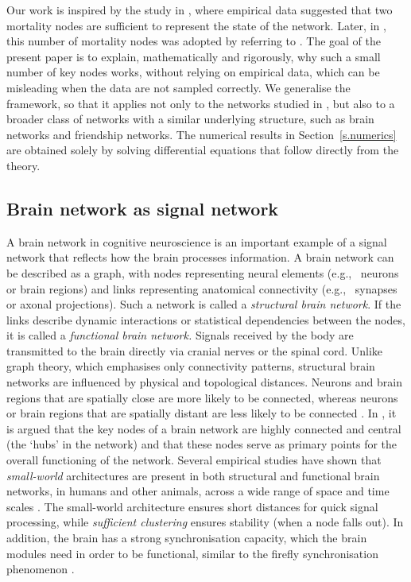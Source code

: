 \documentclass[11pt]{article}
\numberwithin{equation}{section}
\begin{document}
Our work is inspired by the study in \cite{MRFR2017}, where empirical data suggested that two mortality nodes are sufficient to represent the state of the network. Later, in \cite{Aging}, this number of mortality nodes was adopted by referring to \cite{MRFR2017}. The goal of the present paper is to explain, mathematically and rigorously, why such a small number of key nodes works, without relying on empirical data, which can be misleading when the data are not sampled correctly. We generalise the framework, so that it applies not only to the networks studied in \cite{MRFR2017, Aging}, but also to a broader class of networks with a similar underlying structure, such as brain networks and friendship networks. The numerical results in Section~\ref{s.numerics} are obtained solely by solving differential equations that follow directly from the theory.


\subsection{Brain network as signal network}
\label{ss.BN}

A brain network in cognitive neuroscience is an important example of a signal network that reflects how the brain processes information. A brain network can be described as a graph, with nodes representing neural elements (e.g., \ neurons or brain regions) and links representing anatomical connectivity (e.g., \ synapses or axonal projections). Such a network is called a {\em structural brain network}. If the links describe dynamic interactions or statistical dependencies between the nodes, it is called a {\em functional brain network.} Signals received by the body are transmitted to the brain directly via cranial nerves or the spinal cord. Unlike graph theory, which emphasises only connectivity patterns, structural brain networks are influenced by physical and topological distances. Neurons and brain regions that are spatially close are more likely to be connected, whereas neurons or brain regions that are spatially distant are less likely to be connected \cite{BullmoreSporns2009}. In \cite{Sporns2011}, it is argued that the key nodes of a brain network are highly connected and central (the `hubs' in the network) and that these nodes serve as primary points for the overall functioning of the network. Several empirical studies have shown that \emph{small-world} architectures are present in both structural and functional brain networks, in humans and other animals, across a wide range of space and time scales \cite{SW1, SW2, SW3, SW4, BullmoreSporns2009}. The small-world architecture ensures short distances for quick signal processing, while \emph{sufficient clustering} ensures stability (when a node falls out). In addition, the brain has a strong synchronisation capacity, which the brain modules need in order to be functional, similar to the firefly synchronisation phenomenon \cite{Buchanan}.
\end{document}
